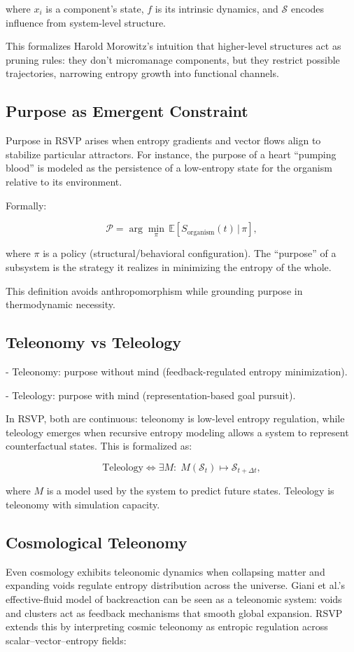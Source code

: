 \documentclass[12pt]{book}
\begin{document}
where \( x_i \) is a component’s state, \( f \) is its intrinsic dynamics, and \( \mathcal{S} \) encodes influence from system-level structure.

This formalizes Harold Morowitz’s intuition that higher-level structures act as pruning rules: they don’t micromanage components, but they restrict possible trajectories, narrowing entropy growth into functional channels.

\subsection{Purpose as Emergent Constraint}
Purpose in RSVP arises when entropy gradients and vector flows align to stabilize particular attractors. For instance, the purpose of a heart “pumping blood” is modeled as the persistence of a low-entropy state for the organism relative to its environment.

Formally:

\[ \mathcal{P} = \arg\min_{\pi} \, \mathbb{E}[S_{\text{organism}}(t) \, | \, \pi], \]

where \( \pi \) is a policy (structural/behavioral configuration). The “purpose” of a subsystem is the strategy it realizes in minimizing the entropy of the whole.

This definition avoids anthropomorphism while grounding purpose in thermodynamic necessity.

\subsection{Teleonomy vs Teleology}
- Teleonomy: purpose without mind (feedback-regulated entropy minimization).

- Teleology: purpose with mind (representation-based goal pursuit).

In RSVP, both are continuous: teleonomy is low-level entropy regulation, while teleology emerges when recursive entropy modeling allows a system to represent counterfactual states. This is formalized as:

\[ \text{Teleology} \iff \exists M : \; M(\mathcal{S}_t) \mapsto \mathcal{S}_{t+\Delta t}, \]

where \( M \) is a model used by the system to predict future states. Teleology is teleonomy with simulation capacity.

\subsection{Cosmological Teleonomy}
Even cosmology exhibits teleonomic dynamics when collapsing matter and expanding voids regulate entropy distribution across the universe. Giani et al.’s effective-fluid model of backreaction can be seen as a teleonomic system: voids and clusters act as feedback mechanisms that smooth global expansion. RSVP extends this by interpreting cosmic teleonomy as entropic regulation across scalar–vector–entropy fields:
\end{document}
